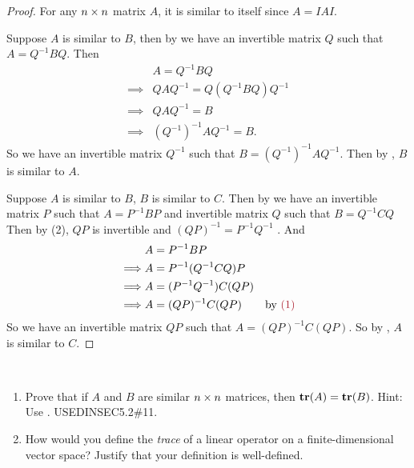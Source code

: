 \begin{proof}
For any \(n \times n\) matrix \(A\), it is similar to itself since \(A = IAI\).

Suppose \(A\) is similar to \(B\), then by  we have an invertible matrix \(Q\) such that \(A = Q^{-1}BQ\).
Then
\begin{align*}
             & A = Q^{-1}BQ \\
    \implies & Q A Q^{-1} = Q (Q^{-1} B Q) Q^{-1} \\
    \implies & Q A Q^{-1} = B \\
    \implies & (Q^{-1})^{-1} A Q^{-1} = B.
\end{align*}
So we have an invertible matrix \(Q^{-1}\) such that \(B = (Q^{-1})^{-1} A Q^{-1}\).
Then by , \(B\) is similar to \(A\).

Suppose \(A\) is similar to \(B\), \(B\) is similar to \(C\).
Then by  we have an invertible matrix \(P\) such that \(A = P^{-1}BP\) and invertible matrix \(Q\) such that \(B = Q^{-1}CQ\)
Then by (2), \(QP\) is invertible and \((QP)^{-1} = P^{-1} Q^{-1}\) .
And
\begin{align*}
             & A = P^{-1}BP \\
    \implies & A = P^{-1} (Q^{-1} C Q) P \\
    \implies & A = (P^{-1} Q^{-1}) C (Q P) \\
    \implies & A = (Q P)^{-1} C (Q P) & \text{by \MAROON{(1)}}
\end{align*}
So we have an invertible matrix \(QP\) such that \(A = (QP)^{-1} C (QP)\).
So by , \(A\) is similar to \(C\).
\end{proof}

\begin{exercise} \label{exercise 2.5.10} \ 

\begin{enumerate}
\item Prove that if \(A\) and \(B\) are similar \(n \times n\) matrices, then \(\textbf{tr}(A) = \textbf{tr}(B)\).
Hint: Use .
USEDINSEC5.2\#11.

\item How would you define the \emph{trace} of a linear operator on a finite-dimensional vector space?
Justify that your definition is well-defined.
\end{enumerate}
\end{exercise}

